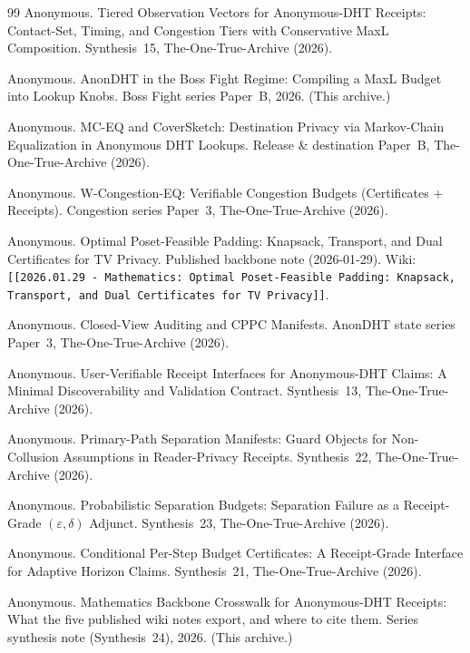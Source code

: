 \documentclass[11pt]{article}
\begin{document}
\begin{thebibliography}{99}
Anonymous.
\newblock Tiered Observation Vectors for Anonymous-DHT Receipts: Contact-Set, Timing, and Congestion Tiers with Conservative MaxL Composition.
\newblock Synthesis~15, The-One-True-Archive (2026).

Anonymous.
\newblock AnonDHT in the Boss Fight Regime: Compiling a MaxL Budget into Lookup Knobs.
\newblock Boss Fight series Paper~B, 2026. (This archive.)

Anonymous.
\newblock MC-EQ and CoverSketch: Destination Privacy via Markov-Chain Equalization in Anonymous DHT Lookups.
\newblock Release \& destination Paper~B, The-One-True-Archive (2026).

Anonymous.
\newblock W-Congestion-EQ: Verifiable Congestion Budgets (Certificates + Receipts).
\newblock Congestion series Paper~3, The-One-True-Archive (2026).

Anonymous.
\newblock Optimal Poset-Feasible Padding: Knapsack, Transport, and Dual Certificates for TV Privacy.
\newblock Published backbone note (2026-01-29). Wiki: \texttt{[[2026.01.29 - Mathematics: Optimal Poset-Feasible Padding: Knapsack, Transport, and Dual Certificates for TV Privacy]]}.

Anonymous.
\newblock Closed-View Auditing and CPPC Manifests.
\newblock AnonDHT state series Paper~3, The-One-True-Archive (2026).

Anonymous.
\newblock User-Verifiable Receipt Interfaces for Anonymous-DHT Claims: A Minimal Discoverability and Validation Contract.
\newblock Synthesis~13, The-One-True-Archive (2026).

Anonymous.
\newblock Primary-Path Separation Manifests: Guard Objects for Non-Collusion Assumptions in Reader-Privacy Receipts.
\newblock Synthesis~22, The-One-True-Archive (2026).

Anonymous.
\newblock Probabilistic Separation Budgets: Separation Failure as a Receipt-Grade $(\varepsilon,\delta)$ Adjunct.
\newblock Synthesis~23, The-One-True-Archive (2026).

Anonymous.
\newblock Conditional Per-Step Budget Certificates: A Receipt-Grade Interface for Adaptive Horizon Claims.
\newblock Synthesis~21, The-One-True-Archive (2026).

Anonymous.
\newblock Mathematics Backbone Crosswalk for Anonymous-DHT Receipts: What the five published wiki notes export, and where to cite them.
\newblock Series synthesis note (Synthesis~24), 2026. (This archive.)


\end{thebibliography}
\end{document}
